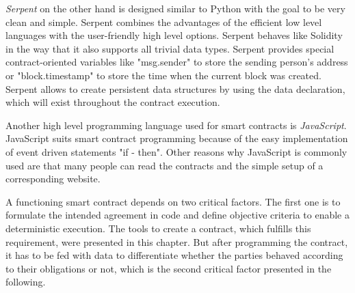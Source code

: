 \documentclass[conference]{IEEEtran}
\begin{document}
\textit{Serpent} on the other hand is designed similar to Python with the goal to be very clean and simple. Serpent combines the advantages of the efficient low level languages with the user-friendly high level options. Serpent behaves like Solidity in the way that it also supports all trivial data types. Serpent provides special contract-oriented variables like "msg.sender" to store the sending person's address or "block.timestamp" to store the time when the current block was created. Serpent allows to create persistent data structures by using the data declaration, which will exist throughout the contract execution. \cite{McAdams2017} \cite{Arnett2015} \par 
Another high level programming language used for smart contracts is \textit{JavaScript}. JavaScript suits smart contract programming because of the easy implementation of event driven statements "if - then". Other reasons why JavaScript is commonly used are that many people can read the contracts and the simple setup of a corresponding website. \cite{bitquant2016} \par 
A functioning smart contract depends on two critical factors. The first one is to formulate the intended agreement in code and define objective criteria to enable a deterministic execution. The tools to create a contract, which fulfills this requirement, were presented in this chapter. But after programming the contract, it has to be fed with data to differentiate whether the parties behaved according to their obligations or not, which is the second critical factor presented in the following. 
\end{document}
